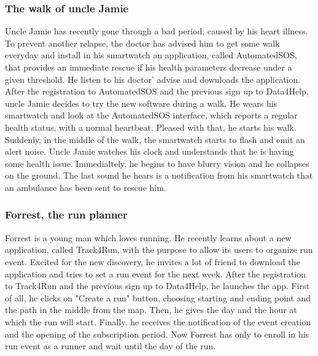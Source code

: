 \documentclass[a4paper]{article}
\begin{document}
\subsubsection{The walk of uncle Jamie}
Uncle Jamie has recently gone through a bad period, caused by his heart illness. To prevent another relapse, the doctor has advised him to get some walk everyday and install in his smartwatch an application, called AutomatedSOS, that provides an immediate rescue if his health parameters decrease under a given threshold. He listen to his doctor' advise and downloads the application. \newline
After the registration to AutomatedSOS and the previous sign up to Data4Help, uncle Jamie decides to try the new software during a walk. He wears his smartwatch and look at the AutomatedSOS interface, which reports a regular health status, with a normal heartbeat. Pleased with that, he starts his walk. \newline
Suddenly, in the middle of the walk, the smartwatch starts to   flash and emit an alert noise. Uncle Jamie watches his clock and understands that he is having some health issue. Immedialtely, he begins to have blurry vision and he collapses on the ground. \newline
The last sound he hears is a notification from his smartwatch that an ambulance has been sent to rescue him.

\subsubsection{Forrest, the run planner}
Forrest is a young man which loves running. He recently learns about a new application, called Track4Run, with the purpose to allow its users to organize run event. Excited for the new discovery, he invites a lot of friend to download the application and tries to set a run event for the next week. \newline
After the registration to Track4Run and the previous sign up to Data4Help, he launches the app. First of all, he clicks on "Create a run" button, choosing starting and ending point and the path in the middle from the map. Then, he gives the day and the hour at which the run will start. Finally, he receives the notification of the event creation and the opening of the subscription period. \newline
Now Forrest has only to enroll in his run event as a runner and wait until the day of the run. 
\end{document}
